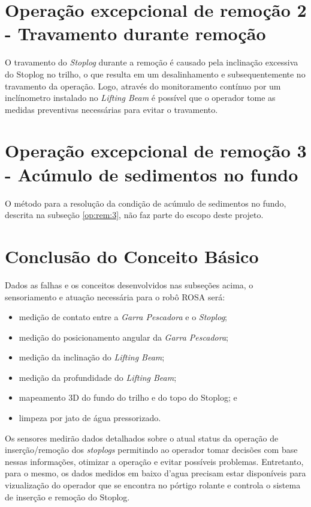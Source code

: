 
\section{Operação excepcional de remoção 2 - Travamento durante remoção}

O travamento do \emph{Stoplog} durante a remoção é causado pela inclinação excessiva do Stoplog no trilho, o que resulta em um desalinhamento e subsequentemente no travamento da operação. Logo, através do monitoramento contínuo por um inclínometro instalado no \emph{Lifting Beam} é possível que o operador tome as medidas preventivas necessárias para evitar o travamento.   


\section{Operação excepcional de remoção 3 - Acúmulo de sedimentos no fundo}
O método para a resolução da condição de acúmulo de sedimentos no fundo,
descrita na subseção \ref{op:rem:3}, não faz parte do escopo deste projeto.



\section{Conclusão do Conceito Básico}

Dados as falhas e os conceitos desenvolvidos nas subseções acima, o
sensoriamento e atuação necessária para o robô ROSA será:

\begin{itemize}

	\item medição de contato entre a \emph{Garra Pescadora} e o \emph{Stoplog}; 
	\item medição do posicionamento angular da \emph{Garra Pescadora}; 
	\item medição da inclinação do \emph{Lifting Beam};
	\item medição da profundidade do \emph{Lifting Beam}; 
	\item mapeamento 3D do fundo do trilho e do topo do Stoplog; e
	\item limpeza por jato de água pressorizado. 

\end{itemize}

Os sensores medirão dados detalhados sobre o atual status da
operação de inserção/remoção dos \emph{stoplogs} permitindo ao operador tomar decisões
com base nessas informações, otimizar a operação e evitar possíveis problemas.
Entretanto, para o mesmo, os dados medidos em baixo d'agua precisam estar
disponíveis para vizualização do operador que se encontra no pórtigo rolante e controla o sistema de inserção e remoção do Stoplog.

